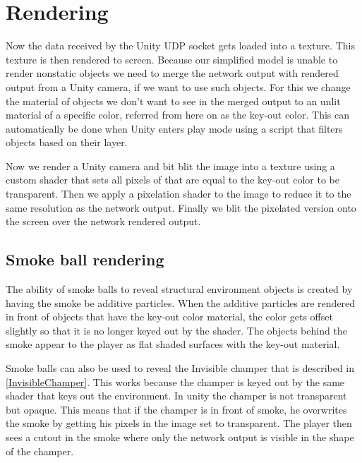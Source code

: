 \section{Rendering}\label{rendering}
Now the data received by the Unity UDP socket gets loaded into a texture. This texture is then rendered to screen. Because our simplified model is unable to render nonstatic objects we need to merge the network output with rendered output from a Unity camera, if we want to use such objects. For this we change the material of objects we don't want to see in the merged output to an unlit material of a specific color, referred from here on as the key-out color. This can automatically be done when Unity enters play mode using a script that filters objects based on their layer.

Now we render a Unity camera and bit blit the image into a texture using a custom shader that sets all pixels of that are equal to the key-out color to be transparent. Then we apply a pixelation shader to the image to reduce it to the same resolution as the network output. Finally we blit the pixelated version onto the screen over the network rendered output.

\subsection{Smoke ball rendering}\label{SmokeBallRendering}
The ability of smoke balls to reveal structural environment objects is created by having the smoke be additive particles. When the additive particles are rendered in front of objects that have the key-out color material, the color gets offset slightly so that it is no longer keyed out by the shader. The objects behind the smoke appear to the player as flat shaded surfaces with the key-out material.

Smoke balls can also be used to reveal the Invisible champer that is described in \cref{InvisibleChamper}. This works because the champer is keyed out by the same shader that keys out the environment. In unity the champer is not transparent but opaque. This means that if the champer is in front of smoke, he overwrites the smoke by getting his pixels in the image set to transparent. The player then sees a cutout in the smoke where only the network output is visible in the shape of the champer.


